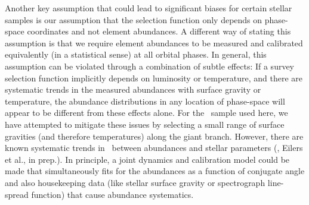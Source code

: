 \documentclass[modern]{aastex63}
\newcommand{\apogee}{\acronym{APOGEE}}
\begin{document}

Another key assumption that could lead to significant biases for certain stellar
samples is our assumption that the selection function only depends on
phase-space coordinates and not element abundances.
A different way of stating this assumption is that we require element abundances
to be measured and calibrated equivalently (in a statistical sense) at all
orbital phases.
In general, this assumption can be violated through a combination of subtle
effects: If a survey selection function implicitly depends on luminosity or
temperature, and there are systematic trends in the measured abundances with
surface gravity or temperature, the abundance distributions in any location of
phase-space will appear to be different from these effects alone.
For the \apogee\ sample used here, we have attempted to mitigate these issues by
selecting a small range of surface gravities (and therefore temperatures) along
the giant branch.
However, there are known systematic trends in \apogee\ between abundances and
stellar parameters (\citealt{Jonsson:2020, Wheeler:2020}, Eilers et al., in
prep.).
In principle, a joint dynamics and calibration model could be made that
simultaneously fits for the abundances as a function of conjugate angle and also
housekeeping data (like stellar surface gravity or spectrograph line-spread
function) that cause abundance systematics.
\end{document}
